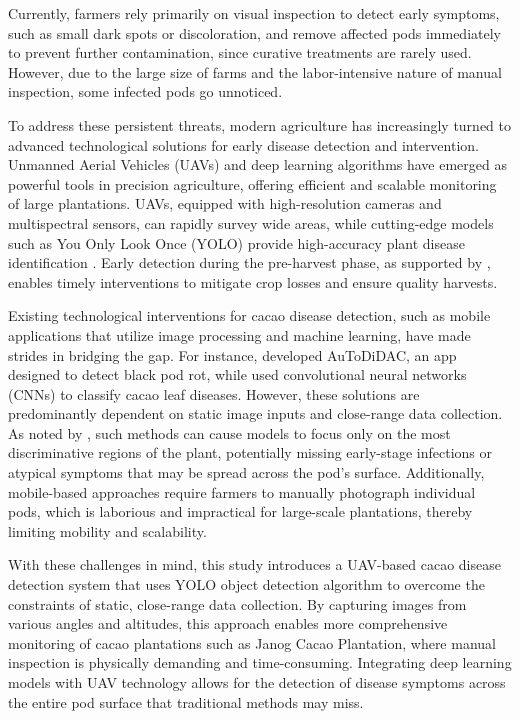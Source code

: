 {Currently, farmers rely primarily on visual inspection to detect early symptoms, such as small dark spots or discoloration, and remove affected pods immediately to prevent further contamination, since curative treatments are rarely used. However, due to the large size of farms and the labor-intensive nature of manual inspection, some infected pods go unnoticed.

To address these persistent threats, modern agriculture has increasingly turned to advanced technological solutions for early disease detection and intervention. Unmanned Aerial Vehicles (UAVs) and deep learning algorithms have emerged as powerful tools in precision agriculture, offering efficient and scalable monitoring of large plantations. UAVs, equipped with high-resolution cameras and multispectral sensors, can rapidly survey wide areas, while cutting-edge models such as You Only Look Once (YOLO) provide high-accuracy plant disease identification \cite{Vyas2023}. Early detection during the pre-harvest phase, as supported by \cite{Upadhyay2025,Yadav2024}, enables timely interventions to mitigate crop losses and ensure quality harvests.

Existing technological interventions for cacao disease detection, such as mobile applications that utilize image processing and machine learning, have made strides in bridging the gap. For instance, \cite{Tan2018} developed AuToDiDAC, an app designed to detect black pod rot, while \cite{Tovurawa2025} used convolutional neural networks (CNNs) to classify cacao leaf diseases. However, these solutions are predominantly dependent on static image inputs and close-range data collection. As noted by \cite{Taesiri2023}, such methods can cause models to focus only on the most discriminative regions of the plant, potentially missing early-stage infections or atypical symptoms that may be spread across the pod’s surface. Additionally, mobile-based approaches require farmers to manually photograph individual pods, which is laborious and impractical for large-scale plantations, thereby limiting mobility and scalability.

With these challenges in mind, this study introduces a UAV-based cacao disease detection system that uses YOLO object detection algorithm to overcome the constraints of static, close-range data collection. By capturing images from various angles and altitudes, this approach enables more comprehensive monitoring of cacao plantations such as Janog Cacao Plantation, where manual inspection is physically demanding and time-consuming. Integrating deep learning models with UAV technology allows for the detection of disease symptoms across the entire pod surface that traditional methods may miss.

}
